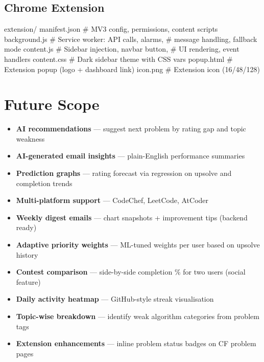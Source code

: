 \documentclass[11pt, a4paper]{article}
\begin{document}
\subsection{Chrome Extension}

\begin{codebox}
extension/
  manifest.json                        # MV3 config, permissions, content scripts
  background.js                        # Service worker: API calls, alarms,
                                       # message handling, fallback mode
  content.js                           # Sidebar injection, navbar button,
                                       # UI rendering, event handlers
  content.css                          # Dark sidebar theme with CSS vars
  popup.html                           # Extension popup (logo + dashboard link)
  icon.png                             # Extension icon (16/48/128)
\end{codebox}

\section{Future Scope}

\begin{itemize}
  \item \textbf{AI recommendations} --- suggest next problem by rating gap and topic weakness
  \item \textbf{AI-generated email insights} --- plain-English performance summaries
  \item \textbf{Prediction graphs} --- rating forecast via regression on upsolve and completion trends
  \item \textbf{Multi-platform support} --- CodeChef, LeetCode, AtCoder
  \item \textbf{Weekly digest emails} --- chart snapshots + improvement tips (backend ready)
  \item \textbf{Adaptive priority weights} --- ML-tuned weights per user based on upsolve history
  \item \textbf{Contest comparison} --- side-by-side completion \% for two users (social feature)
  \item \textbf{Daily activity heatmap} --- GitHub-style streak visualisation
  \item \textbf{Topic-wise breakdown} --- identify weak algorithm categories from problem tags
  \item \textbf{Extension enhancements} --- inline problem status badges on CF problem pages
\end{itemize}
\end{document}
